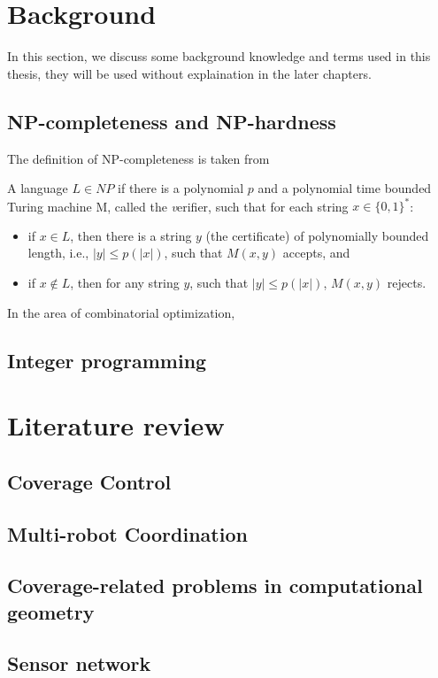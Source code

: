 \section{Background}
In this section, we discuss some background knowledge and terms used in this thesis,
they will be used without explaination in the later chapters. 

\subsection{NP-completeness and NP-hardness}
The definition of NP-completeness is taken from \cite{vazirani2001approximation}
\begin{definition}[NP-completeness]
    A language $L\in NP$ if there is a polynomial $p$ and a polynomial time bounded Turing machine M, 
    called the {\textit verifier}, such that for each string $x\in \{0, 1\}^*$: 
\begin{itemize}
    \item if $x\in L$, then there is a string $y$ (the certificate) of polynomially bounded length, i.e., $|y| \leq p(|x|)$,
    such that $M(x, y)$ accepts, and 
    \item if $x\notin L$, then for any string $y$, such that $|y|\leq p(|x|)$, $M(x,y)$ rejects.
\end{itemize}
\end{definition}

In the area of combinatorial optimization, 
\subsection{Integer programming}

\section{Literature review} 
\subsection{Coverage Control}
\subsection{Multi-robot Coordination}
\subsection{Coverage-related problems in computational geometry}
\subsection{Sensor network}
